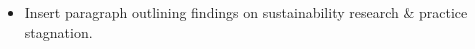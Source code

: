 \documentclass{article}
\begin{document}
	\begin{itemize}
		\item Insert paragraph outlining findings on sustainability research \& practice stagnation.
	\end{itemize}







	\clearpage
	
	
\end{document}
